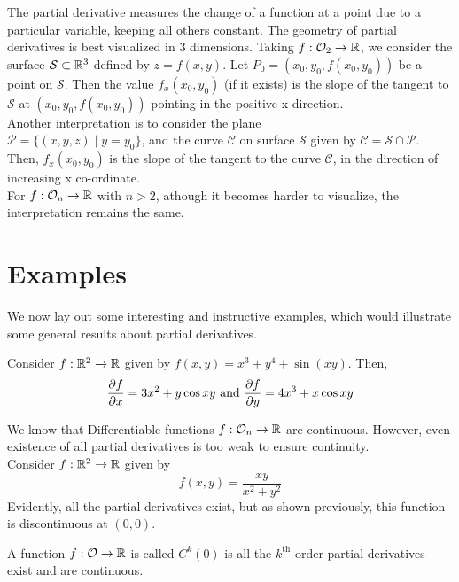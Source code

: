 \documentclass[../Analysis-3.tex]{subfiles}
\begin{document}
The partial derivative measures the change of a function at a point due to a particular variable, keeping all others constant. The geometry of partial derivatives is best visualized in 3 dimensions. Taking $f: \mathcal{O}_2 \to \mathbb{R}$, we consider the surface $\mathcal{S} \subset \mathbb{R}^3$ defined by $z = f(x,y)$. Let $P_0 = (x_0, y_0, f(x_0, y_0))$ be a point on $\mathcal{S}$. Then the value $f_x(x_0, y_0)$ (if it exists) is the slope of the tangent to $\mathcal{S}$ at $(x_0, y_0, f(x_0, y_0))$ pointing in the positive x direction.\\
Another interpretation is to consider the plane \\
$\mathcal{P} = \{(x,y,z) \mid y = y_0\}$, and the curve $\mathcal{C}$ on surface $\mathcal{S}$ given by $\mathcal{C} = \mathcal{S} \cap \mathcal{P}$. Then, $f_x(x_0, y_0)$ is the slope of the tangent to the curve $\mathcal{C}$, in the direction of increasing x co-ordinate.\\
For $f: \mathcal{O}_n \to \mathbb{R}$ with $n > 2$, athough it becomes harder to visualize, the interpretation remains the same.

\newpage

\section{Examples}

We now lay out some interesting and instructive examples, which would illustrate some general results about partial derivatives.

\begin{Eg}{}{}
  Consider $f: \mathbb{R}^2 \to \mathbb{R}$ given by $f(x,y) = x^3 + y^4 + \sin(xy)$. Then,
  $$\pdv{f}{x} = 3x^2 + y\cos{xy} \text{ and } \pdv{f}{y} = 4x^3 + x\cos{xy}$$
\end{Eg}

\begin{Eg}{}{}
  We know that Differentiable functions  $f: \mathcal{O}_n \to \mathbb{R}$ are continuous. However, even existence of all partial derivatives is too weak to ensure continuity.\\
  Consider $f: \mathbb{R}^2 \to \mathbb{R}$ given by
  $$f(x,y) = \frac{xy}{x^2 + y^2}$$
  Evidently, all the partial derivatives exist, but as shown previously, this function is discontinuous at $(0,0)$.
\end{Eg}

\begin{Def}{}{}
  A function $f: \mathcal{O} \to \mathbb{R}$ is called $C^k(\mathcal{0})$ is all the \( {k}^{\text{th}} \) order partial derivatives exist and are continuous.
\end{Def}
\end{document}
